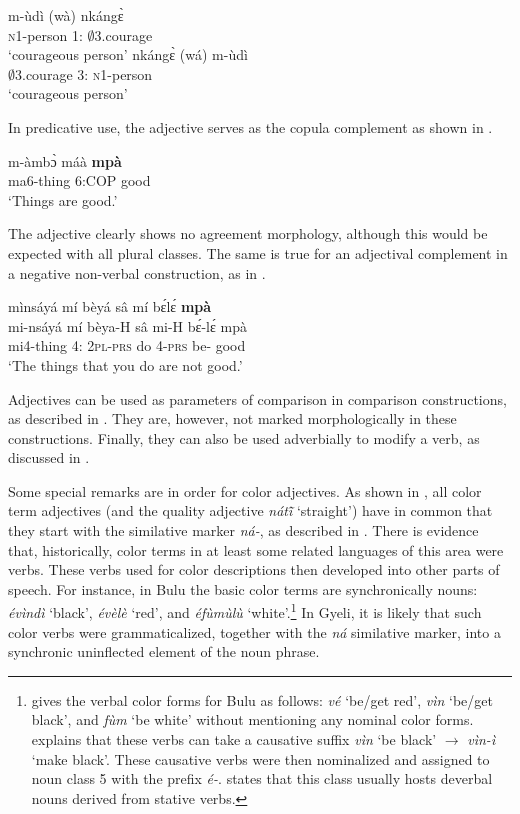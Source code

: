 \ea \label{qualif4}
  \ea \label{qualif4a}
 \gll  m-ùdì (wà) nkángɛ̀\\
          \textsc{n}1-person 1:{\ATT} $\emptyset$3.courage  \\
    \trans `courageous person'
\ex \label{qualif4b}
  \gll   nkángɛ̀ (wá) m-ùdì\\
          $\emptyset$3.courage 3:{\ATT} \textsc{n}1-person \\
    \trans `courageous person'
\z
\z


In predicative use, the adjective serves as the copula complement as shown in .

\ea \label{qualif5}
\gll m-àmbɔ̀ máà {\bfseries mpà} \\
	ma6-thing 6:COP good\\
    \trans `Things are good.'
\z


\noindent The adjective clearly shows no agreement morphology, although this would be expected with all plural classes. The same is true for an adjectival complement in a negative non-verbal construction, as in .

\ea \label{qualif6}
\glll  mìnsáyá mí bèyá sâ mí bɛ́lɛ́ {\bfseries mpà}\\
      mi-nsáyá mí bèya-H sâ mi-H bɛ́-lɛ́ mpà\\
	mi4-thing 4:{\ATT} 2\textsc{pl}-\textsc{prs} do 4-\textsc{prs} be-{\NEG} good  \\
    \trans `The things that you do are not good.'
\z


Adjectives can be used as parameters of comparison in comparison constructions, as described in .  They are, however, not marked morphologically in these constructions. Finally, they can also be used adverbially to modify a verb, as discussed in .




Some special remarks are in order for color adjectives. As shown in , all color term adjectives (and the quality adjective {\itshape nátĩ̂} `straight') have in common that they start with the similative marker {\itshape ná-}, as described in . There is evidence that,  historically, color terms in at least some related languages of this area were verbs. These verbs used for color descriptions then developed into other parts of speech. For instance, in Bulu the basic color terms are synchronically nouns: {\itshape évìndì} `black', {\itshape évèlè} `red', and {\itshape éfùmùlù} `white'.\footnote{\citet{bates04} gives the verbal color forms for Bulu as follows: {\itshape vé} ‘be/get red’, {\itshape vìn} ‘be/get black’, and {\itshape fùm} ‘be white’ without mentioning any nominal color forms. \citet[44]{alexandre55} explains that these verbs can take a causative suffix {\itshape vìn} `be black' $\rightarrow$ {\itshape vìn-ì} `make black'. These causative verbs were then nominalized and assigned to noun class 5 with the prefix {\itshape é-}. \citet[68]{alexandre55} states that this class usually hosts deverbal nouns derived from stative verbs.} In Gyeli, it is likely that such color verbs were grammaticalized, together with the {\itshape ná} similative marker, into a synchronic uninflected element of the noun phrase.

